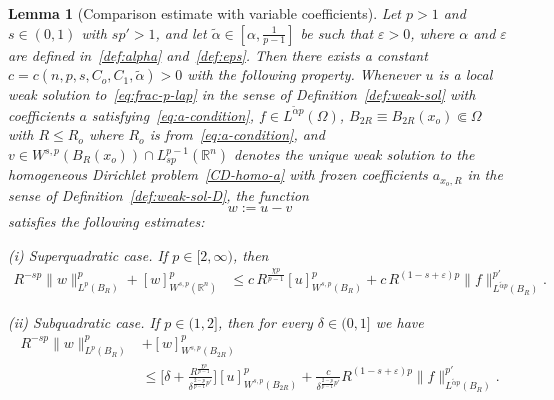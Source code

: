 \documentclass[10pt,letterpaper]{amsart}
\newtheorem{lemma}[theorem]{Lemma}
\theoremstyle{definition}
\numberwithin{theorem}{section}
\numberwithin{equation}{section}
\newcommand{\R}{\ensuremath{\mathbb{R}}}
\newcommand{\1}{\ensuremath{\mathds{1}}}
\renewcommand{\epsilon}{\varepsilon}
\renewcommand{\epsilon}{\varepsilon}
\numberwithin{equation}{section}
\begin{document}
\begin{lemma}[Comparison estimate with variable coefficients]\label{lem:compar-var-coeff}
Let $p>1$ and $s\in(0,1)$ with $sp'>1$, and let $\tilde\alpha\in[\alpha,\frac{1}{p-1}]$ be such that $\epsilon>0$, where $\alpha$ and $\epsilon$ are defined in~\eqref{def:alpha} and~\eqref{def:eps}.
Then there exists a constant 
$c=c(n,p,s,C_o,C_1,\tilde\alpha)>0$ with the following property. 
Whenever $u$ is a local weak solution to~\eqref{eq:frac-p-lap} in the sense of Definition~\ref{def:weak-sol} with coefficients $a$ satisfying~\eqref{eq:a-condition}, $f\in L^{\tilde\alpha p}(\Omega)$, $B_{2R}\equiv B_{2R}(x_o)\Subset\Omega$ with $R \leq R_o$ where $R_o$ is from~\eqref{eq:a-condition}, and $v\in W^{s,p}(B_R(x_o)) \cap L^{p-1}_{sp}(\R^n)$ denotes the unique weak solution to the homogeneous Dirichlet problem~\eqref{CD-homo-a} with frozen coefficients $a_{x_o,R}$ in the sense of Definition~\ref{def:weak-sol-D}, the function
\[
w := u-v
\]
satisfies the following estimates:


\medskip
\noindent
\emph{(i) Superquadratic case.} 
If $p\in[2,\infty)$, then
\begin{align*}
    R^{-sp}\|w\|_{L^p(B_R)}^p + [w]_{W^{s,p}(\R^n)}^p
    &\leq 
    c\,R^{\frac{\chi p}{p-1}}[u]^p_{W^{s,p}(B_R)} +
    c\, R^{(1-s+\epsilon)p} \|f\|_{L^{\tilde\alpha p}(B_R)}^{p'}.
\end{align*}

\medskip
\noindent
\emph{(ii) Subquadratic case.} 
If $p\in(1,2]$,  then for every $\delta\in(0,1]$ we have
\begin{align*}
    R^{-sp}\|w\|_{L^p(B_R)}^p &+ [w]^p_{W^{s,p}(B_{2R})}\\
    &\le 
    \bigg[\delta 
     +
     \frac{R^{\frac{\chi p}{p-1}}}{\delta^{\frac{2-p}{p-1}p'}} \bigg]
     [u]_{W^{s,p}(B_{2R})}^p 
     + 
     \frac{c}{\delta^{\frac{2-p}{p-1}p'}} 
     R^{(1-s+\epsilon)p}
    \|f\|_{L^{\tilde\alpha p}(B_R)}^{p'} .
\end{align*}
\end{lemma}
\end{document}

